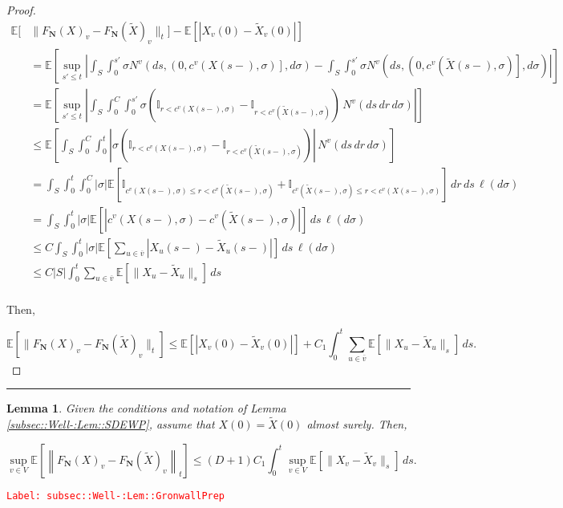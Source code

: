 \documentclass[12pt]{article}
\newcommand{\mb}{\mathbb}
\newcommand{\ov}{\overline}
\newcommand{\tr}{\textcolor{red}}
\newcommand{\labe}[1]{\tr{\texttt{Label: #1}}}
\newcommand{\lin}{\rule{\linewidth}{0.4 pt}}
\newcommand{\ex}[1]{\mb{E}\left[#1\right]}			%
\renewcommand{\v}{v}							%
\newcommand{\vv}{u}								%
\renewcommand{\S}{S}							%
\newcommand{\s}{\sigma}							%
\renewcommand{\t}{t}							%
\renewcommand{\tt}{s}							%
\newcommand{\ttt}{s'}							%
\newcommand{\X}{X}								%
\newcommand{\IGr}{c}							%
\newcommand{\vind}[1]{^{#1}}					%
\newcommand{\cind}[1]{_{#1}}					%
\newcommand{\cl}{\ov}							%
\newcommand{\tp}[1]{(#1)}						%
\newcommand{\const}{C}							%
\newcommand{\degr}{D}							%
\newcommand{\poisses}{\mathbf{N}}				%
\newcommand{\poiss}{N}							%
\newcommand{\Sm}{\ell}							%
\newcommand{\Fpo}{F_{\poisses}}					%
\renewcommand{\r}{r}							%
\newcommand{\alt}[1]{\widetilde{#1}}			%
\newcommand{\indx}[1]{_{#1}}					%
\newtheorem{lem}[thms]{Lemma}
\begin{document}
\begin{proof}
\begin{align*}
\mb{E}\bigg[&\|\Fpo(\X)\cind{\v} - \Fpo(\alt{\X})\cind{\v}\|_\t\bigg] - \ex{|\X\cind{\v}\tp{0} - \alt{\X}\cind{\v}\tp{0}|}\\
&= \ex{\sup_{\ttt \leq \t}\left|\int_\S\int_0^{\ttt} \s\poiss\vind{\v}\left(d\tt,\left(0,\IGr\vind{\v}(\X\tp{\tt-},\s)\right],d\s\right) -  \int_\S\int_0^{\ttt} \s\poiss\vind{\v}\left(d\tt,\left(0,\IGr\vind{\v}(\alt{\X}\tp{\tt-},\s)\right],d\s\right)\right|}\\
&=\ex{\sup_{\ttt\leq \t} \left|\int_\S \int_0^{\const} \int_0^{\ttt} \s\left(\mb{I}_{\r < \IGr\vind{\v}(\X\tp{\tt-},\s)} - \mb{I}_{\r < \IGr\vind{\v}(\alt{\X}\tp{\tt-},\s)}\right)\,\poiss\vind{\v}(d\tt\,d\r\,d\s)\right|}\\
&\leq \ex{\int_\S\int_0^{\const}\int_0^\t \left|\s\left(\mb{I}_{\r < \IGr\vind{\v}(\X\tp{\tt-},\s)} - \mb{I}_{\r < \IGr\vind{\v}(\alt{\X}\tp{\tt-},\s)}\right)\right|\,\poiss\vind{\v}(d\tt\,d\r\,d\s)}\\
&=\int_\S\int_0^\t\int_0^{\const} |\s|\ex{\mb{I}_{\IGr\vind{\v}(\X\tp{\tt-},\s) \leq \r < \IGr\vind{\v}(\alt{\X}\tp{\tt-},\s)} + \mb{I}_{\IGr\vind{\v}(\alt{\X}\tp{\tt-},\s) \leq \r < \IGr\vind{\v}(\X\tp{\tt-},\s)}}\,d\r\,d\tt\,\Sm(d\s)\\
&= \int_\S\int_0^\t|\s|\ex{\left|\IGr\vind{\v}(\X\tp{\tt-},\s) - \IGr\vind{\v}(\alt{\X}\tp{\tt-},\s)\right|}\,d\tt\,\Sm(d\s)\\
&\leq \const\int_\S\int_0^\t |\s| \ex{\sum_{\vv \in \cl{\v}}|\X\cind{\vv}\tp{\tt-} - \alt{\X}\cind{\vv}\tp{\tt-}|}\,d\tt\,\Sm(d\s)\\
&\leq \const|\S|\int_0^\t \sum_{\vv \in \cl{\v}}\ex{\|\X\cind{\vv} - \alt{\X}\cind{\vv}\|_\tt}\,d\tt\\
\end{align*}

Then,

\[\ex{\|\Fpo(\X)\cind{\v} - \Fpo(\alt{\X})\cind{\v}\|_\t} \leq \ex{|\X\cind{\v}\tp{0} - \alt{\X}\cind{\v}\tp{0}|} +  \const\indx{1}\int_0^\t \sum_{\vv\in \cl{\v}} \ex{\|\X\cind{\vv} - \alt{\X}\cind{\vv}\|_\tt}\,d\tt.\]

\end{proof}

\lin

\begin{lem}
Given the conditions and notation of Lemma \ref{subsec::Well-:Lem::SDEWP}, assume that \(\X\tp{0} = \alt{\X}\tp{0}\) almost surely. Then,

\[\sup_{\v \in V} \ex{\left\|\Fpo(\X)\cind{\v} - \Fpo(\alt{\X})\cind{\v}\right\|_\t} \leq (\degr+1)\const\indx{1}\int_0^\t \sup_{\v \in V} \ex{\|\X\cind{\v} - \alt{\X}\cind{\v}\|_\tt}\,d\tt.\]
\label{subsec::Well-:Lem::GronwallPrep}
\end{lem}
\labe{subsec::Well-:Lem::GronwallPrep}
\end{document}
